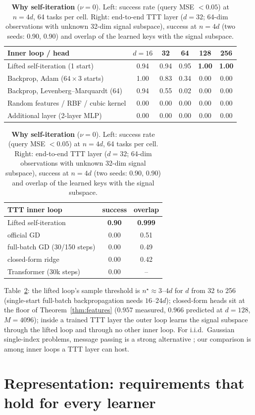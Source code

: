 \documentclass{article}
\theoremstyle{definition}
\theoremstyle{remark}
\begin{document}
\begin{table}[t]
\caption{\textbf{Why self-iteration} ($\nu=0$). Left: success rate (query MSE $<0.05$) at $n=4d$, 64 tasks per cell. Right: end-to-end TTT layer ($d=32$; 64-dim observations with unknown 32-dim signal subspace), success at $n=4d$ (two seeds: 0.90, 0.90) and overlap of the learned keys with the signal subspace.}
\label{tab:exact}
\centering\small
\begin{tabular}{lccccc}
\toprule
Inner loop / head & $d=16$ & 32 & 64 & 128 & 256\\
\midrule
Lifted self-iteration (1 start) & 0.94 & 0.94 & 0.95 & \textbf{1.00} & \textbf{1.00}\\
Backprop, Adam ($64\times3$ starts) & 1.00 & 0.83 & 0.34 & 0.00 & 0.00\\
Backprop, Levenberg--Marquardt (64) & 0.94 & 0.55 & 0.02 & 0.00 & 0.00\\
Random features / RBF / cubic kernel & 0.00 & 0.00 & 0.00 & 0.00 & 0.00\\
Additional layer (2-layer MLP) & 0.00 & 0.00 & 0.00 & 0.00 & 0.00\\
\bottomrule
\end{tabular}
\hfill
\begin{tabular}{lcc}
\toprule
TTT inner loop & success & overlap\\
\midrule
Lifted self-iteration & \textbf{0.90} & \textbf{0.999}\\
official GD & 0.00 & 0.51\\
full-batch GD (30/150 steps) & 0.00 & 0.49\\
closed-form ridge & 0.00 & 0.42\\
Transformer (30k steps) & 0.00 & --\\
\bottomrule
\end{tabular}
\end{table}

Table~\ref{tab:exact}: the lifted loop's sample threshold is $n^\star\approx3$--$4d$ for $d$ from 32 to 256 (single-start full-batch backpropagation needs $16$--$24d$); closed-form heads sit at the floor of Theorem~\ref{thm:features} ($0.957$ measured, $0.966$ predicted at $d=128$, $M=4096$); inside a trained TTT layer the outer loop learns the signal subspace through the lifted loop and through no other inner loop.
For i.i.d.\ Gaussian single-index problems, message passing is a strong alternative \citep{rangan2011gamp}; our comparison is among inner loops a TTT layer can host.

\section{Representation: requirements that hold for every learner}
\label{sec:base}
\end{document}
